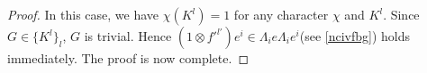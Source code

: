 \documentclass[10pt,a4paper]{amsart}
\begin{document}
\begin{proof}
In this case, we have $\chi(K^l) = 1$ for any character $\chi$ and $K^l$. Since $G \in \{K^l\}_l$, $G$ is trivial. Hence 
$(1 \otimes f'^{l'})e^i \in \Lambda_i e \Lambda_i e^{i}$(see \ref{ncivfbg}) holds immediately. 
The proof is now complete. 
%
%
%
\end{proof}
\end{document}
